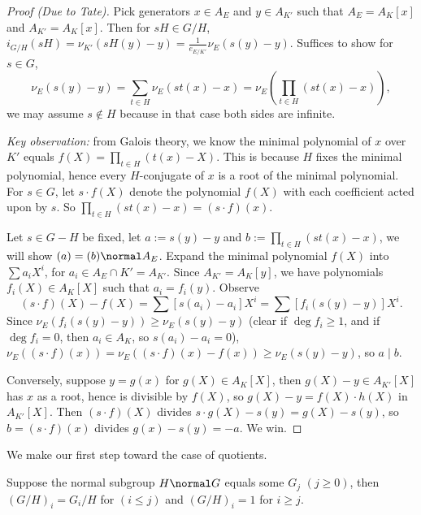 \documentclass[11pt]{amsart}
\begin{document}
\begin{proof}[Proof (Due to Tate)]
    Pick generators $x \in A_E$ and $y \in A_{K'}$ such that $A_E = A_K[x]$ and
    $A_{K'} = A_K[x]$.  Then for $sH \in G/H$, $i_{G/H}(sH) = \nu_{K'}(sH(y) -
    y) = \frac{1}{e_{E/K'}} \nu_E(s(y) - y)$.  Suffices to show for $s \in G$,
    \[
        \nu_E(s(y) - y) = \sum_{t \in H} \nu_E(st(x) - x)
        = \nu_E(\prod_{t \in H} (st(x) - x)),
    \]
    we may assume $s \not\in H$ because in that case both sides are infinite.

    \medskip

    \emph{Key observation:}  from Galois theory, we know the minimal polynomial
    of $x$ over $K'$ equals $f(X) = \prod_{t \in H} (t(x) - X)$.  This is
    because $H$ fixes the minimal polynomial, hence every $H$-conjugate of $x$
    is a root of the minimal polynomial.  For $s \in G$, let $s \cdot f(X)$
    denote the polynomial $f(X)$ with each coefficient acted upon by $s$.  So
    $\prod_{t \in H} (st(x) - x) = (s \cdot f)(x)$.

    \medskip

    Let $s \in G - H$ be fixed, let $a := s(y) - y$ and $b := \prod_{t \in H}
    (st(x) - x)$, we will show $(a) = (b) \normal A_E$.  Expand the minimal
    polynomial $f(X)$ into $\sum a_i X^i$, for $a_i \in A_E \cap K' = A_{K'}$.
    Since $A_{K'} = A_K[y]$, we have polynomials $f_i(X) \in A_K[X]$ such that
    $a_i = f_i(y)$.  Observe
    \[
        (s \cdot f)(X) - f(X)
        = \sum [s(a_i) - a_i] X^i
        = \sum [f_i(s(y) - y)] X^i.
    \]
    Since $\nu_E(f_i(s(y) - y)) \geq \nu_E(s(y) - y)$ (clear if $\deg f_i \geq
    1$, and if $\deg f_i = 0$, then $a_i \in A_K$, so $s(a_i) - a_i = 0$),
    $\nu_E((s \cdot f)(x)) = \nu_E((s \cdot f)(x) - f(x)) \geq \nu_E(s(y) - y)$,
    so $a \mid b$.

    Conversely, suppose $y = g(x)$ for $g(X) \in A_K[X]$, then $g(X) - y \in
    A_{K'}[X]$ has $x$ as a root, hence is divisible by $f(X)$, so $g(X) - y =
    f(X) \cdot h(X)$ in $A_{K'}[X]$.  Then $(s \cdot f)(X)$ divides $s \cdot
    g(X) - s(y) = g(X) - s(y)$, so $b = (s \cdot f)(x)$ divides $g(x) - s(y) =
    -a$. We win.
\end{proof}

\medskip

We make our first step toward the case of quotients.

\begin{prop}
    Suppose the normal subgroup $H \normal G$ equals some $G_j$ $(j \geq 0)$,
    then $(G/H)_i = G_i/H$ for $(i \leq j)$ and $(G/H)_i = 1$ for $i \geq j$.
\end{prop}
\end{document}
